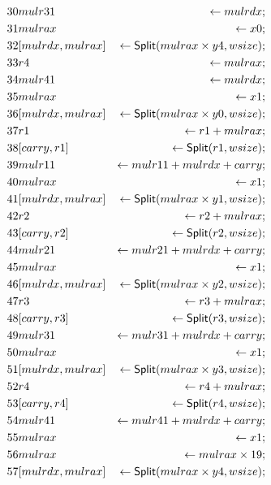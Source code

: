 \begin{align*}
30 & mulr31 & \leftarrow mulrdx; \\
31 & mulrax & \leftarrow x0; \\
32 & \concat{mulrdx}{mulrax} & \leftarrow \dslcode{Split}(mulrax \times y4, wsize); \\
33 & r4 & \leftarrow mulrax; \\
34 & mulr41 & \leftarrow mulrdx; \\
35 & mulrax & \leftarrow x1; \\
36 & \concat{mulrdx}{mulrax} & \leftarrow \dslcode{Split}(mulrax \times y0, wsize); \\
37 & r1 & \leftarrow r1 + mulrax; \\
38 & \concat{carry}{r1} & \leftarrow \dslcode{Split}(r1, wsize); \\
39 & mulr11 & \leftarrow mulr11 + mulrdx + carry; \\
40 & mulrax & \leftarrow x1; \\
41 & \concat{mulrdx}{mulrax} & \leftarrow \dslcode{Split}(mulrax \times y1, wsize); \\
42 & r2 & \leftarrow r2 + mulrax; \\
43 & \concat{carry}{r2} & \leftarrow \dslcode{Split}(r2, wsize); \\
44 & mulr21 & \leftarrow mulr21 + mulrdx + carry; \\
45 & mulrax & \leftarrow x1; \\
46 & \concat{mulrdx}{mulrax} & \leftarrow \dslcode{Split}(mulrax \times y2, wsize); \\
47 & r3 & \leftarrow r3 + mulrax; \\
48 & \concat{carry}{r3} & \leftarrow \dslcode{Split}(r3, wsize); \\
49 & mulr31 & \leftarrow mulr31 + mulrdx + carry; \\
50 & mulrax & \leftarrow x1; \\
51 & \concat{mulrdx}{mulrax} & \leftarrow \dslcode{Split}(mulrax \times y3, wsize); \\
52 & r4 & \leftarrow r4 + mulrax; \\
53 & \concat{carry}{r4} & \leftarrow \dslcode{Split}(r4, wsize); \\
54 & mulr41 & \leftarrow mulr41 + mulrdx + carry; \\
55 & mulrax & \leftarrow x1; \\
56 & mulrax & \leftarrow mulrax \times 19; \\
57 & \concat{mulrdx}{mulrax} & \leftarrow \dslcode{Split}(mulrax \times y4, wsize); \\

\end{align*}
